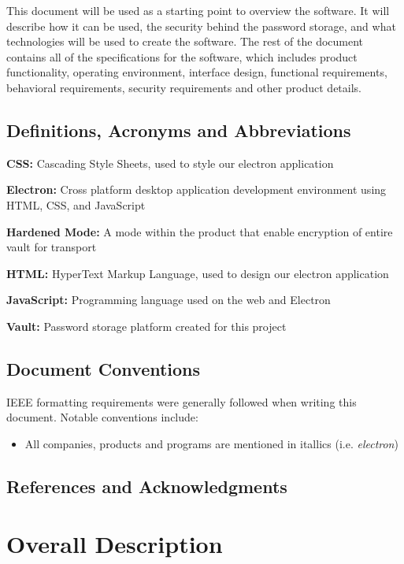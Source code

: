 \documentclass[11pt]{report}
\begin{document}
This document will be used as a starting point to overview the
software. It will describe how it can be used, the security behind the
password storage, and what technologies will be used to create the software.
The rest of the document contains all of the specifications for the
software, which includes product functionality, operating environment,
interface design, functional requirements, behavioral requirements, 
security requirements and other product details.


\section{Definitions, Acronyms and Abbreviations}
\textbf{CSS:} Cascading Style Sheets, used to style our electron application

\textbf{Electron:} Cross platform desktop application development environment
using HTML, CSS, and JavaScript

\textbf{Hardened Mode:} A mode within the product that enable encryption of entire
vault for transport

\textbf{HTML:} HyperText Markup Language, used to design our electron application

\textbf{JavaScript:} Programming language used on the web and Electron

\textbf{Vault:} Password storage platform created for this project


\section{Document Conventions}
IEEE formatting requirements were generally followed when writing this document.
Notable conventions include:

\begin{itemize}
    \item All companies, products and programs are mentioned in itallics (i.e. \textit{electron})
    
\end{itemize}


\section{References and Acknowledgments}

    \nocite{*}
    \printbibliography[heading=none]



\chapter{Overall Description}
\end{document}
